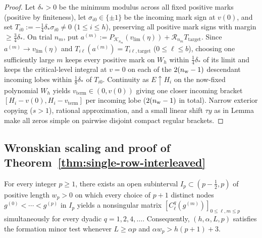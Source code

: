\begin{proof}
Let $\delta_*>0$ be the minimum modulus across all fixed positive marks (positive by finiteness), let $\sigma_{i0}\in\{\pm 1\}$ be the incoming mark sign at $v(0)$, and set $T_{i0}:=-\frac{1}{4}\delta_*\sigma_{i0}\ne 0$ ($1\le i\le h$), preserving all positive mark signs with margin $\ge\frac{3}{4}\delta_*$. On trial $n_m$, put $a^{(m)}:=P_{\mathcal{K}_{n_m}}(v_{\lim}(\eta))+\mathcal{R}_{n_m}T_{\mathrm{target}}$. Since $a^{(m)}\to v_{\lim}(\eta)$ and $T_{i\ell}(a^{(m)})=T_{i\ell,\mathrm{target}}$ ($0\le\ell\le b$), choosing one sufficiently large $m$ keeps every positive mark on $W_h$ within $\frac{1}{4}\delta_*$ of its limit and keeps the critical-level integral at $v=0$ on each of the $2(n_{\rm w}-1)$ descendant incoming lobes within $\frac{1}{8}\delta_*$ of $T_{i0}$. Continuity as $E\uparrow H_i$ on the now-fixed polynomial $W_h$ yields $v_{\mathrm{term}}\in(0,v(0))$ giving one closer incoming bracket $[H_i-v(0),H_i-v_{\mathrm{term}}]$ per incoming lobe ($2(n_{\rm w}-1)$ in total). Narrow exterior copying ($s>1$), rational approximation, and a small linear shift $\tau y$ as in Lemma~ make all zeros simple on pairwise disjoint compact regular brackets.
\end{proof}

\subsection{Wronskian scaling and proof of Theorem~\ref{thm:single-row-interleaved}}

\begin{lemma}\label{lem:wronskian-scaling}
For every integer $p\ge 1$, there exists an open subinterval $I_p\subset(p-\frac{1}{2},p)$ of positive length $w_p>0$ on which every choice of $p+1$ distinct nodes $g^{(0)}<\cdots<g^{(p)}$ in $I_p$ yields a nonsingular matrix $[C_\ell^q(g^{(m)})]_{0\le\ell,m\le p}$ simultaneously for every dyadic $q=1,2,4,\dots$. Consequently, $(h,\alpha,L,p)$ satisfies the formation minor test whenever $L\ge\alpha p$ and $\alpha w_p > h(p+1)+3$.
\end{lemma}

